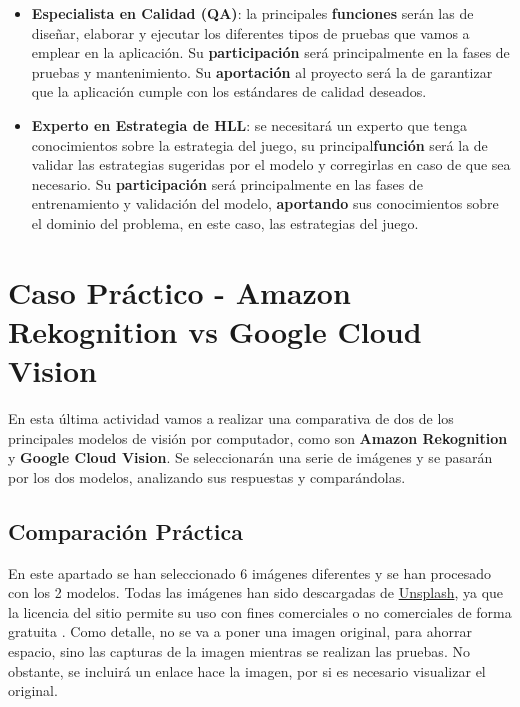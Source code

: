 \begin{itemize}
	\item \textbf{Especialista en Calidad (QA)}: la principales \textbf{funciones} serán las de diseñar, elaborar y ejecutar los diferentes tipos de pruebas que vamos a emplear en la aplicación. Su \textbf{participación} será principalmente en la fases de pruebas y mantenimiento. Su \textbf{aportación} al proyecto será la de garantizar que la aplicación cumple con los estándares de calidad deseados.
	
	\item \textbf{Experto en Estrategia de HLL}: se necesitará un experto que tenga conocimientos sobre la estrategia del juego, su principal\textbf{función} será la de validar las estrategias sugeridas por el modelo y corregirlas en caso de que sea necesario. Su \textbf{participación} será principalmente en las fases de entrenamiento y validación del modelo, \textbf{aportando} sus conocimientos sobre el dominio del problema, en este caso, las estrategias del juego.         
\end{itemize} 

\section{Caso Práctico - Amazon Rekognition vs Google Cloud Vision}
En esta última actividad vamos a realizar una comparativa de dos de los principales modelos de visión por computador, como son \textbf{Amazon Rekognition} y \textbf{Google Cloud Vision}. Se seleccionarán una serie de imágenes y se pasarán por los dos modelos, analizando sus respuestas y comparándolas.

\subsection{Comparación Práctica}
En este apartado se han seleccionado 6 imágenes diferentes y se han procesado con los 2 modelos.  Todas las imágenes han sido descargadas de \href{https://unsplash.com/es}{Unsplash}, ya que la licencia del sitio permite su uso con fines comerciales o no comerciales de forma gratuita \cite{unsplash}. Como detalle, no se va a poner una imagen original, para ahorrar espacio, sino las capturas de la imagen mientras se realizan las pruebas. No obstante, se incluirá un enlace hace la imagen, por si es necesario visualizar el original.

